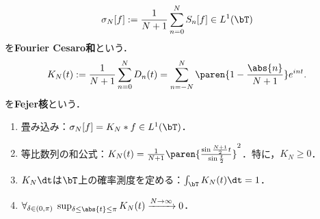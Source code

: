 \documentclass[uplatex,dvipdfmx]{jsreport}
\begin{document}
\begin{theorem}[Fejer核との畳み込みとしてのCesaro和]\label{thm-Fejer-kernel-on-T}
    \[\sigma_N[f]:=\frac{1}{N+1}\sum_{n=0}^NS_n[f]\in L^1(\bT)\]
    を\textbf{Fourier Cesaro和}という．
    \[K_N(t):=\frac{1}{N+1}\sum_{n=0}^ND_n(t)=\sum_{n=-N}^N\paren{1-\frac{\abs{n}}{N+1}}e^{int}.\]
    を\textbf{Fejer核}という．
    \begin{enumerate}
        \item 畳み込み：$\sigma_N[f]=K_N*f\in L^1(\bT)$．
        \item 等比数列の和公式：$K_N(t)=\frac{1}{N+1}\paren{\frac{\sin\frac{N+1}{2}t}{\sin\frac{t}{2}}}^2$．特に，$K_N\ge0$．
        \item $K_N\dt$は$\bT$上の確率測度を定める：$\int_\bT K_N(t)\dt=1$．
        \item $\forall_{\delta\in(0,\pi)}\;\sup_{\delta\le\abs{t}\le\pi}K_N(t)\xrightarrow{N\to\infty}0$．
    \end{enumerate}
\end{theorem}
\end{document}
